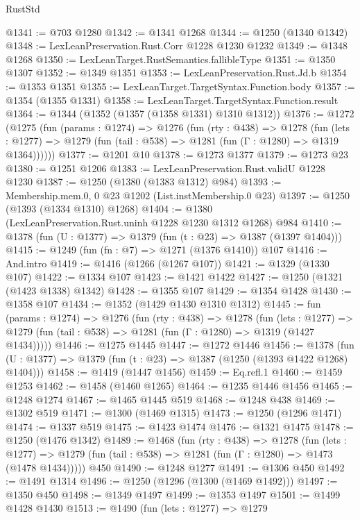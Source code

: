 \begin{lexlean}{RustStd}
\begin{coremodule}
@1341 := @703 @1280
@1342 := @1341 @1268
@1344 := @1250 (@1340 @1342)
@1348 := LexLeanPreservation.Rust.Corr @1228 @1230 @1232
@1349 := @1348 @1268
@1350 := LexLeanTarget.RustSemantics.fallibleType
@1351 := @1350 @1307
@1352 := @1349 @1351
@1353 := LexLeanPreservation.Rust.Jd.b
@1354 := @1353 @1351
@1355 := LexLeanTarget.TargetSyntax.Function.body
@1357 := @1354 (@1355 @1331)
@1358 := LexLeanTarget.TargetSyntax.Function.result
@1364 := @1344 (@1352 (@1357 (@1358 @1331) @1310 @1312))
@1376 := @1272
    (@1275
      (fun (params : @1274) =>
      @1276
        (fun (rty : @438) =>
        @1278
          (fun (lets : @1277) =>
          @1279 (fun (tail : @538) => @1281 (fun (Γ : @1280) => @1319 @1364))))))
@1377 := @1201 @10
@1378 := @1273 @1377
@1379 := @1273 @23
@1380 := @1251 @1206
@1383 := LexLeanPreservation.Rust.validU @1228 @1230
@1387 := @1250 (@1380 (@1383 @1312) @984)
@1393 := Membership.mem.{0, 0} @23 @1202 (List.instMembership.{0} @23)
@1397 := @1250 (@1393 (@1334 @1310) @1268)
@1404 := @1380 (LexLeanPreservation.Rust.uninh @1228 @1230 @1312 @1268) @984
@1410 := @1378 (fun (U : @1377) => @1379 (fun (t : @23) => @1387 (@1397 @1404)))
@1415 := @1249 (fun (fn : @7) => @1271 (@1376 @1410)) @107
@1416 := And.intro
@1419 := @1416 (@1266 (@1267 @107))
@1421 := @1329 (@1330 @107)
@1422 := @1334 @107
@1423 := @1421 @1422
@1427 := @1250 (@1321 (@1423 @1338) @1342)
@1428 := @1355 @107
@1429 := @1354 @1428
@1430 := @1358 @107
@1434 := @1352 (@1429 @1430 @1310 @1312)
@1445 := fun (params : @1274) =>
  @1276
    (fun (rty : @438) =>
    @1278
      (fun (lets : @1277) =>
      @1279 (fun (tail : @538) => @1281 (fun (Γ : @1280) => @1319 (@1427 @1434)))))
@1446 := @1275 @1445
@1447 := @1272 @1446
@1456 := @1378 (fun (U : @1377) => @1379 (fun (t : @23) => @1387 (@1250 (@1393 @1422 @1268) @1404)))
@1458 := @1419 (@1447 @1456)
@1459 := Eq.refl.{1}
@1460 := @1459 @1253
@1462 := @1458 (@1460 @1265)
@1464 := @1235 @1446 @1456
@1465 := @1248 @1274
@1467 := @1465 @1445 @519
@1468 := @1248 @438
@1469 := @1302 @519
@1471 := @1300 (@1469 @1315)
@1473 := @1250 (@1296 @1471)
@1474 := @1337 @519
@1475 := @1423 @1474
@1476 := @1321 @1475
@1478 := @1250 (@1476 @1342)
@1489 := @1468
    (fun (rty : @438) =>
    @1278
      (fun (lets : @1277) =>
      @1279 (fun (tail : @538) => @1281 (fun (Γ : @1280) => @1473 (@1478 @1434)))))
    @450
@1490 := @1248 @1277
@1491 := @1306 @450
@1492 := @1491 @1314
@1496 := @1250 (@1296 (@1300 (@1469 @1492)))
@1497 := @1350 @450
@1498 := @1349 @1497
@1499 := @1353 @1497
@1501 := @1499 @1428 @1430
@1513 := @1490
    (fun (lets : @1277) =>
    @1279

\end{coremodule}
\end{lexlean}

